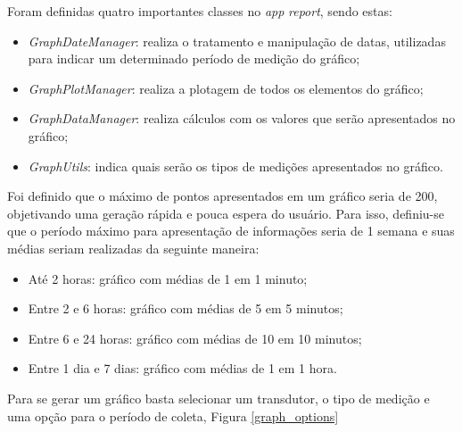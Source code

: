 Foram definidas quatro importantes classes no \textit{app} \textit{report}, sendo estas:

\begin{itemize}
    \item \textit{GraphDateManager}: realiza o tratamento e manipulação de datas, utilizadas para indicar um determinado período de medição do gráfico;
    \item \textit{GraphPlotManager}: realiza a plotagem de todos os elementos do gráfico;
    \item \textit{GraphDataManager}: realiza cálculos com os valores que serão apresentados no gráfico;
    \item \textit{GraphUtils}: indica quais serão os tipos de medições apresentados no gráfico.
\end{itemize}

Foi definido que o máximo de pontos apresentados em um gráfico seria de 200, objetivando uma geração rápida e pouca espera do usuário. Para isso, definiu-se que o período máximo para apresentação de informações seria de 1 semana e suas médias seriam realizadas da seguinte maneira:

\begin{itemize}
    \item Até 2 horas: gráfico com médias de 1 em 1 minuto;
    \item Entre 2 e 6 horas: gráfico com médias de 5 em 5 minutos;
    \item Entre 6 e 24 horas: gráfico com médias de 10 em 10 minutos;
    \item Entre 1 dia e 7 dias: gráfico com médias de 1 em 1 hora.
\end{itemize}


Para se gerar um gráfico basta selecionar um transdutor, o tipo de medição e uma opção para o período de coleta, Figura \ref{graph_options}

